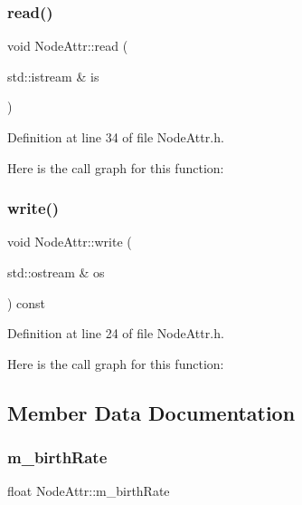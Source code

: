 \subsubsection{\texorpdfstring{read()}{read()}}
{\footnotesize\ttfamily void Node\+Attr\+::read (\begin{DoxyParamCaption}\item[{std\+::istream \&}]{is }\end{DoxyParamCaption})\hspace{0.3cm}{\ttfamily [inline]}}



Definition at line 34 of file Node\+Attr.\+h.

Here is the call graph for this function\+:
\mbox{\label{struct_node_attr_a689f2d11e05d5cbf82f8b4ddff2dc658}} 
\subsubsection{\texorpdfstring{write()}{write()}}
{\footnotesize\ttfamily void Node\+Attr\+::write (\begin{DoxyParamCaption}\item[{std\+::ostream \&}]{os }\end{DoxyParamCaption}) const\hspace{0.3cm}{\ttfamily [inline]}}



Definition at line 24 of file Node\+Attr.\+h.

Here is the call graph for this function\+:


\subsection{Member Data Documentation}
\mbox{\label{struct_node_attr_a9bd12eee0adc8d7a8686d425d749ada8}} 
\subsubsection{\texorpdfstring{m\+\_\+birth\+Rate}{m\_birthRate}}
{\footnotesize\ttfamily float Node\+Attr\+::m\+\_\+birth\+Rate}



